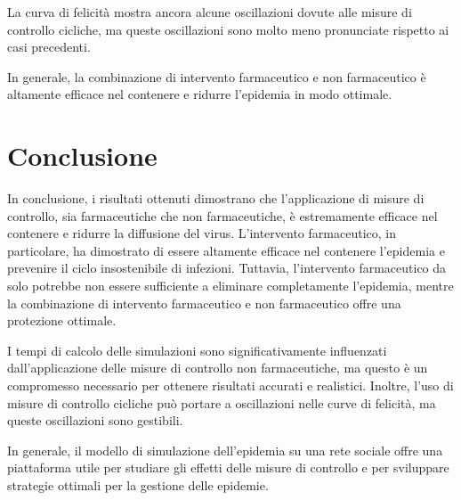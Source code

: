 La curva di felicità mostra ancora alcune oscillazioni dovute 
alle misure di controllo cicliche, ma queste oscillazioni sono 
molto meno pronunciate rispetto ai casi precedenti.

In generale, la combinazione di intervento farmaceutico e non 
farmaceutico è altamente efficace nel contenere e ridurre 
l'epidemia in modo ottimale.

\section{Conclusione}

In conclusione, i risultati ottenuti dimostrano che l'applicazione 
di misure di controllo, sia farmaceutiche che non farmaceutiche, 
è estremamente efficace nel contenere e ridurre la diffusione del virus. 
L'intervento farmaceutico, in particolare, ha dimostrato di essere 
altamente efficace nel contenere l'epidemia e prevenire il ciclo 
insostenibile di infezioni. Tuttavia, l'intervento farmaceutico 
da solo potrebbe non essere sufficiente a eliminare completamente 
l'epidemia, mentre la combinazione di intervento farmaceutico e 
non farmaceutico offre una protezione ottimale.

I tempi di calcolo delle simulazioni sono significativamente 
influenzati dall'applicazione delle misure di controllo non 
farmaceutiche, ma questo è un compromesso necessario per ottenere 
risultati accurati e realistici. Inoltre, l'uso di misure di controllo 
cicliche può portare a oscillazioni nelle curve di felicità, 
ma queste oscillazioni sono gestibili.

In generale, il modello di simulazione dell'epidemia su una 
rete sociale offre una piattaforma utile per studiare gli effetti 
delle misure di controllo e per sviluppare strategie ottimali per 
la gestione delle epidemie.